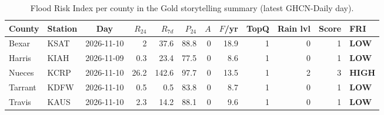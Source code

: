 \begin{table}[H]\centering\scriptsize
\caption{Flood Risk Index per county in the Gold storytelling summary (latest GHCN-Daily day).}\label{tab:fri}
\begin{tabular}{@{}llcrrrrrrrrl@{}}\toprule
County & Station & Day & $R_{24}$ & $R_{7d}$ & $P_{24}$ & $A$ & $F$/yr & TopQ & Rain lvl & Score & FRI\\\midrule
Bexar & KSAT & 2026-11-10 & 2 & 37.6 & 88.8 & 0 & 18.9 & 1 & 0 & 1 & \textbf{LOW}\\
Harris & KIAH & 2026-11-09 & 0.3 & 23.4 & 77.5 & 0 & 8.6 & 1 & 0 & 1 & \textbf{LOW}\\
Nueces & KCRP & 2026-11-10 & 26.2 & 142.6 & 97.7 & 0 & 13.5 & 1 & 2 & 3 & \textbf{HIGH}\\
Tarrant & KDFW & 2026-11-10 & 0.5 & 0.5 & 83.8 & 0 & 8.7 & 1 & 0 & 1 & \textbf{LOW}\\
Travis & KAUS & 2026-11-10 & 2.3 & 14.2 & 88.1 & 0 & 9.6 & 1 & 0 & 1 & \textbf{LOW}\\
\bottomrule\end{tabular}\end{table}